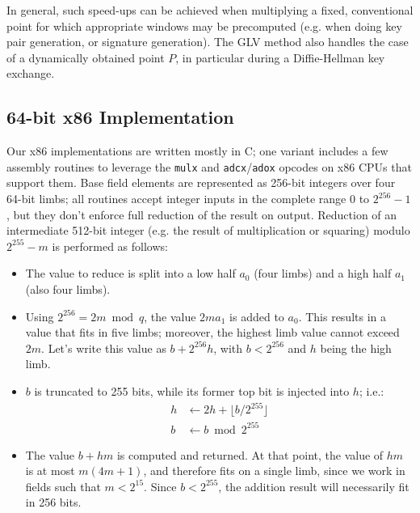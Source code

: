 \documentclass{llncs}
\begin{document}
In general, such speed-ups can be achieved when multiplying a fixed,
conventional point for which appropriate windows may be precomputed
(e.g. when doing key pair generation, or signature generation). The GLV
method also handles the case of a dynamically obtained point $P$, in
particular during a Diffie-Hellman key exchange.

\subsection{64-bit x86 Implementation}\label{sec:implementations:x86}

Our x86 implementations are written mostly in C; one variant includes a
few assembly routines to leverage the \verb+mulx+ and
\verb+adcx+/\verb+adox+ opcodes on x86 CPUs that support them. Base
field elements are represented as 256-bit integers over four 64-bit
limbs; all routines accept integer inputs in the complete range $0$ to
$2^{256}-1$, but they don't enforce full reduction of the result on
output. Reduction of an intermediate 512-bit integer (e.g. the result of
multiplication or squaring) modulo $2^{255} - m$ is performed as
follows:
\begin{itemize}

    \item The value to reduce is split into a low half $a_0$ (four
    limbs) and a high half $a_1$ (also four limbs).

    \item Using $2^{256} = 2m \bmod q$, the value $2ma_1$ is added
    to $a_0$. This results in a value that fits in five limbs;
    moreover, the highest limb value cannot exceed $2m$. Let's
    write this value as $b + 2^{256}h$, with $b < 2^{256}$ and
    $h$ being the high limb.

    \item $b$ is truncated to 255 bits, while its former top bit is
    injected into $h$; i.e.:
    \begin{align*}
        h &\leftarrow 2h + \lfloor b / 2^{255} \rfloor \\
        b &\leftarrow b \bmod 2^{255}
    \end{align*}

    \item The value $b + hm$ is computed and returned. At that point,
    the value of $hm$ is at most $m(4m+1)$, and therefore fits on a
    single limb, since we work in fields such that $m < 2^{15}$. Since
    $b < 2^{255}$, the addition result will necessarily fit in 256 bits.

\end{itemize}
\end{document}
